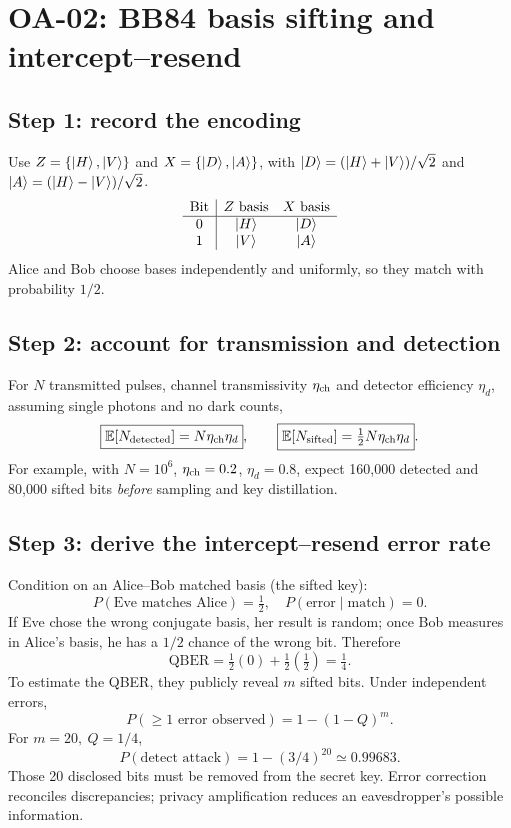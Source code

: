 
\section{OA-02: BB84 basis sifting and intercept--resend}
\subsection*{Step 1: record the encoding}
Use \(Z=\{\left\lvert H\right\rangle,\left\lvert V\right\rangle\}\) and
\(X=\{\left\lvert D\right\rangle,\left\lvert A\right\rangle\}\), with
\(\left\lvert D\right\rangle=(\left\lvert H\right\rangle+\left\lvert V\right\rangle)/\sqrt2\) and
\(\left\lvert A\right\rangle=(\left\lvert H\right\rangle-\left\lvert V\right\rangle)/\sqrt2\).
\[
\begin{array}{c|cc}
\text{Bit}&Z\text{ basis}&X\text{ basis}\\\hline
0&\left\lvert H\right\rangle&\left\lvert D\right\rangle\\
1&\left\lvert V\right\rangle&\left\lvert A\right\rangle
\end{array}
\]
Alice and Bob choose bases independently and uniformly,
so they match with probability \(1/2\).

\subsection*{Step 2: account for transmission and detection}
For \(N\) transmitted pulses, channel transmissivity
\(\eta_{\rm ch}\) and detector efficiency \(\eta_d\),
assuming single photons and no dark counts,
\[
\boxed{\mathbb E[N_{\rm detected}]=N\eta_{\rm ch}\eta_d},
\qquad
\boxed{\mathbb E[N_{\rm sifted}]=\tfrac12
N\eta_{\rm ch}\eta_d}.
\]
For example, with \(N=10^6\), \(\eta_{\rm ch}=0.2\),
\(\eta_d=0.8\), expect 160,000 detected and
80,000 sifted bits \emph{before} sampling and key distillation.

\subsection*{Step 3: derive the intercept--resend error rate}
Condition on an Alice--Bob matched basis (the sifted key):
\[
P(\text{Eve matches Alice})=\tfrac12,\quad
P(\text{error}\mid\text{match})=0.
\]
If Eve chose the wrong conjugate basis, her result is
random; once Bob measures in Alice's basis, he has a
\(1/2\) chance of the wrong bit. Therefore
\[
\boxed{\mathrm{QBER}=\tfrac12(0)+\tfrac12(\tfrac12)=\tfrac14}.
\]
To estimate the QBER, they publicly reveal \(m\)
sifted bits. Under independent errors,
\[
P(\ge1\text{ error observed})=1-(1-Q)^m.
\]
For \(m=20,\ Q=1/4\),
\[
\boxed{P(\text{detect attack})=1-(3/4)^{20}
\simeq0.99683}.
\]
Those 20 disclosed bits must be removed from the secret
key. Error correction reconciles discrepancies; privacy
amplification reduces an eavesdropper's possible information.
